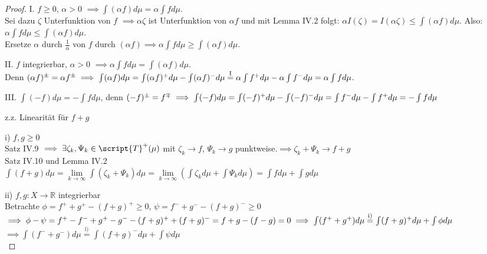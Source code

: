   \begin{proof}
    \item[I.] $f\geq 0$, $\alpha > 0$ $\implies \int (\alpha f) d\mu = \alpha \int f d\mu$. \\
    Sei dazu $\zeta$ Unterfunktion von $f$ $\implies \alpha \zeta$ ist Unterfunktion von $\alpha f$ und mit Lemma IV.2 folgt: $\alpha I(\zeta) = I(\alpha \zeta) \leq \int (\alpha f) d\mu$. Also: $\alpha \int f d\mu \leq \int (\alpha f) d\mu$. \\
    Ersetze $\alpha$ durch $\frac{1}{\alpha}$ von $f$ durch $(\alpha f) \implies \alpha \int f d\mu \geq \int (\alpha f) d\mu$. 
    \item[II.] $f$ integrierbar, $\alpha > 0$ $\implies \alpha \int f d\mu = \int (\alpha f) d\mu$. \\ Denn $(\alpha f)^\pm = \alpha f^\pm \\ \implies \int (\alpha f) d\mu = \int (\alpha f)^+ d\mu - \int (\alpha f)^- d\mu \overset{\text{I}}{=} \alpha \int f^+ d\mu - \alpha \int f^- d\mu = \alpha \int f d\mu$.
    \item[III.] $\int (-f) d\mu = -\int f d\mu$, denn $(-f)^\pm = f^\mp \\ \implies \int (-f) d\mu = \int (-f)^+ d\mu - \int (-f)^- d\mu = \int f^- d\mu - \int f^+ d\mu = -\int f d\mu$ \\
    \item[z.z.] Linearität für $f+g$ 
    \item[i)]$f,g \geq 0$ \\
    Satz IV.9 $\implies \exists \zeta_k,\Psi_k \in \script{T}^+(\mu)$ mit $\zeta_k \to f$, $\Psi_k \to g$ punktweise.$\implies \zeta_k + \Psi_k \to f+g$ \\
    Satz IV.10 und Lemma IV.2 \\
    $\int (f+g) d\mu = \lim\limits_{k\to\infty} \int (\zeta_k +\Psi_k ) d\mu = \lim\limits_{k\to\infty}(\int \zeta_k d\mu + \int \Psi_k d\mu) = \int f d\mu + \int g d\mu$ 
    \item[ii)] $f,g: X\to\mathbb{R}$ integrierbar \\
    Betrachte $\phi = f^+ + g^+ - (f+g)^+ \geq 0$, $\psi = f^- + g^- -(f+g)^- \geq 0$ \\
    $\implies \phi-\psi = f^+ - f^- +g^+-g^--(f+g)^++(f+g)^- = f+g-(f-g) = 0 \\
    \implies \int (f^+ + g^+) d\mu \overset{\text{i)}}{=} \int (f+g)^+ d\mu + \int \phi d\mu $ \\
    $\implies \int (f^- + g^- )d\mu \overset{\text{i)}}{=} \int (f+g)^- d\mu + \int \psi d\mu$ \\

\end{proof}
